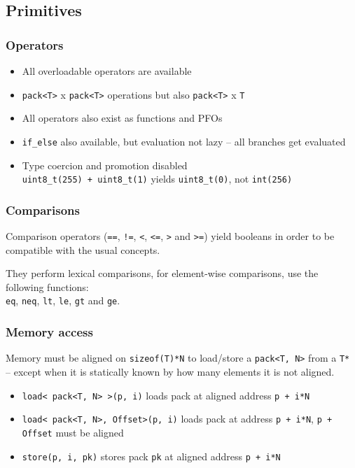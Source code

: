 \documentclass{beamer}
\begin{document}
\subsection{Primitives}

\begin{frame}
	\frametitle{Operators}
	
	\begin{itemize}
		\item All overloadable operators are available
		\item \lstinline{pack<T>} x \lstinline{pack<T>} operations but also \lstinline{pack<T>} x \lstinline{T}
		\item All operators also exist as functions and PFOs
		\item \lstinline{if_else} also available, but evaluation not lazy -- all branches get evaluated
		\item Type coercion and promotion disabled\\
		      \lstinline{uint8_t(255) + uint8_t(1)} yields \lstinline{uint8_t(0)}, not \lstinline{int(256)}
	\end{itemize}	
	
\end{frame}

\begin{frame}
	\frametitle{Comparisons}
	
	Comparison operators (\lstinline{==}, \lstinline{!=}, \lstinline{<}, \lstinline{<=}, \lstinline{>} and \lstinline{>=})
	yield booleans in order to be compatible with the usual concepts.
	\bigskip
	
	They perform lexical comparisons, for element-wise comparisons, use the following functions:\\
	\lstinline{eq}, \lstinline{neq}, \lstinline{lt}, \lstinline{le}, \lstinline{gt} and \lstinline{ge}.
\end{frame}

\begin{frame}
	\frametitle{Memory access}
	
	Memory must be aligned on \lstinline{sizeof(T)*N} to load/store a \lstinline{pack<T, N>}
	from a \lstinline{T*}\\
	-- except when it is statically known by how many elements it is not aligned.
	
	\begin{itemize}
		\item \lstinline{load< pack<T, N> >(p, i)} loads pack at aligned address \lstinline{p + i*N}
		\item \lstinline{load< pack<T, N>, Offset>(p, i)} loads pack at address \lstinline{p + i*N}, \lstinline{p + Offset} must be aligned
		\item \lstinline{store(p, i, pk)} stores pack \lstinline{pk} at aligned address \lstinline{p + i*N}
	\end{itemize}
\end{frame}
\end{document}
